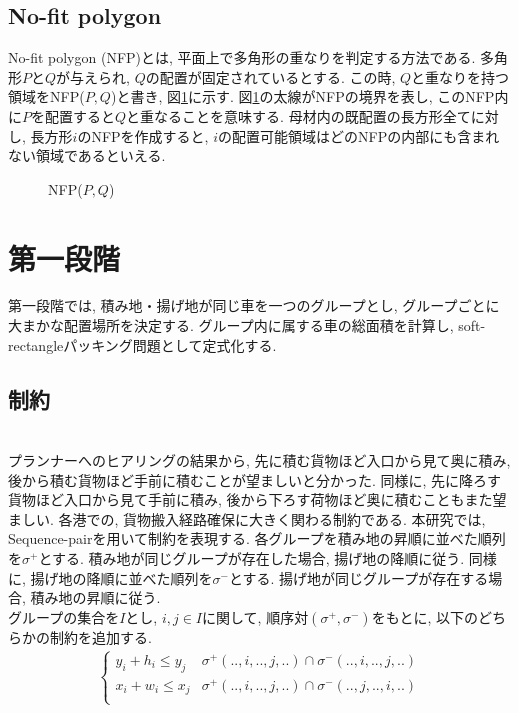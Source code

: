\subsection{No-fit polygon}
No-fit polygon (NFP)とは, 平面上で多角形の重なりを判定する方法である\cite{nfp}\cite{nfp2}. 
多角形$P$と$Q$が与えられ, $Q$の配置が固定されているとする. 
この時, $Q$と重なりを持つ領域をNFP($P,Q$)と書き, 図\ref{figure31}に示す. 
図\ref{figure31}の太線がNFPの境界を表し, このNFP内に$P$を配置すると$Q$と重なることを意味する. 
母材内の既配置の長方形全てに対し, 長方形$i$のNFPを作成すると, $i$の配置可能領域はどのNFPの内部にも含まれない領域であるといえる. 

\begin{figure}
    \label{figure31}
    \caption{NFP($P,Q$)}
\end{figure}

\section{第一段階}
第一段階では, 積み地・揚げ地が同じ車を一つのグループとし, グループごとに大まかな配置場所を決定する. 
グループ内に属する車の総面積を計算し, soft-rectangleパッキング問題として定式化する. 

\subsection{制約}
\\
プランナーへのヒアリングの結果から, 先に積む貨物ほど入口から見て奥に積み, 後から積む貨物ほど手前に積むことが望ましいと分かった. 
同様に, 先に降ろす貨物ほど入口から見て手前に積み, 後から下ろす荷物ほど奥に積むこともまた望ましい. 
各港での, 貨物搬入経路確保に大きく関わる制約である.
本研究では, Sequence-pairを用いて制約を表現する. 
各グループを積み地の昇順に並べた順列を$\sigma^+$とする. 
積み地が同じグループが存在した場合, 揚げ地の降順に従う. 
同様に, 揚げ地の降順に並べた順列を$\sigma^-$とする.
揚げ地が同じグループが存在する場合, 積み地の昇順に従う. \\
グループの集合を$I$とし, $i,j \in I$に関して, 順序対$(\sigma^+,\sigma^-)$をもとに, 以下のどちらかの制約を追加する. \\
\begin{eqnarray}
    \left\{
        \begin{array}{ll}
            y_i + h_i \leq y_j & \sigma^+(..,i,..,j,..) \cap \sigma^-(..,i,..,j,..) \\
            x_i + w_i \leq x_j & \sigma^+(..,i,..,j,..) \cap \sigma^-(..,j,..,i,..) \\
        \end{array}
    \right.
\end{eqnarray}\\


